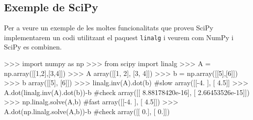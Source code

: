 \subsection{Exemple de SciPy}
Per a veure un exemple de les moltes funcionalitats que proveu SciPy implementarem un codi utilitzant el paquest {\tt linalg} i veurem com NumPy i SciPy es combinen.
\begin{blockcode}
>>> import numpy as np
>>> from scipy import linalg
>>> A = np.array([[1,2],[3,4]])
>>> A
array([[1, 2],
      [3, 4]])
>>> b = np.array([[5],[6]])
>>> b
array([[5],
      [6]])
>>> linalg.inv(A).dot(b) #slow
array([[-4. ],
      [ 4.5]]
>>> A.dot(linalg.inv(A).dot(b))-b #check
array([[  8.88178420e-16],
      [  2.66453526e-15]])
>>> np.linalg.solve(A,b) #fast
array([[-4. ],
      [ 4.5]])
>>> A.dot(np.linalg.solve(A,b))-b #check
array([[ 0.],
      [ 0.]])
\end{blockcode}


